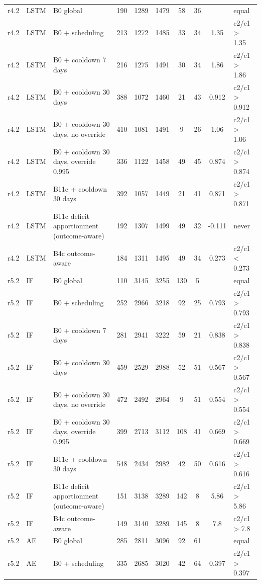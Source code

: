 \documentclass[10pt,onecolumn,letterpaper]{article}
\begin{document}
\begin{longtable}{llp{4.6cm}ccccccl}
r4.2 & LSTM & B0 global & 190 & 1289 & 1479 & 58 & 36 &  & equal \\
r4.2 & LSTM & B0 + scheduling & 213 & 1272 & 1485 & 33 & 34 & 1.35 & c2/c1 > 1.35 \\
r4.2 & LSTM & B0 + cooldown 7 days & 216 & 1275 & 1491 & 30 & 34 & 1.86 & c2/c1 > 1.86 \\
r4.2 & LSTM & B0 + cooldown 30 days & 388 & 1072 & 1460 & 21 & 43 & 0.912 & c2/c1 > 0.912 \\
r4.2 & LSTM & B0 + cooldown 30 days, no override & 410 & 1081 & 1491 & 9 & 26 & 1.06 & c2/c1 > 1.06 \\
r4.2 & LSTM & B0 + cooldown 30 days, override 0.995 & 336 & 1122 & 1458 & 49 & 45 & 0.874 & c2/c1 > 0.874 \\
r4.2 & LSTM & B11c + cooldown 30 days & 392 & 1057 & 1449 & 21 & 41 & 0.871 & c2/c1 > 0.871 \\
r4.2 & LSTM & B11c deficit apportionment (outcome-aware) & 192 & 1307 & 1499 & 49 & 32 & -0.111 & never \\
r4.2 & LSTM & B4c outcome-aware & 184 & 1311 & 1495 & 49 & 34 & 0.273 & c2/c1 < 0.273 \\
r5.2 & IF & B0 global & 110 & 3145 & 3255 & 130 & 5 &  & equal \\
r5.2 & IF & B0 + scheduling & 252 & 2966 & 3218 & 92 & 25 & 0.793 & c2/c1 > 0.793 \\
r5.2 & IF & B0 + cooldown 7 days & 281 & 2941 & 3222 & 59 & 21 & 0.838 & c2/c1 > 0.838 \\
r5.2 & IF & B0 + cooldown 30 days & 459 & 2529 & 2988 & 52 & 51 & 0.567 & c2/c1 > 0.567 \\
r5.2 & IF & B0 + cooldown 30 days, no override & 472 & 2492 & 2964 & 9 & 51 & 0.554 & c2/c1 > 0.554 \\
r5.2 & IF & B0 + cooldown 30 days, override 0.995 & 399 & 2713 & 3112 & 108 & 41 & 0.669 & c2/c1 > 0.669 \\
r5.2 & IF & B11c + cooldown 30 days & 548 & 2434 & 2982 & 42 & 50 & 0.616 & c2/c1 > 0.616 \\
r5.2 & IF & B11c deficit apportionment (outcome-aware) & 151 & 3138 & 3289 & 142 & 8 & 5.86 & c2/c1 > 5.86 \\
r5.2 & IF & B4c outcome-aware & 149 & 3140 & 3289 & 145 & 8 & 7.8 & c2/c1 > 7.8 \\
r5.2 & AE & B0 global & 285 & 2811 & 3096 & 92 & 61 &  & equal \\
r5.2 & AE & B0 + scheduling & 335 & 2685 & 3020 & 42 & 64 & 0.397 & c2/c1 > 0.397 \\

\end{longtable}
\end{document}
